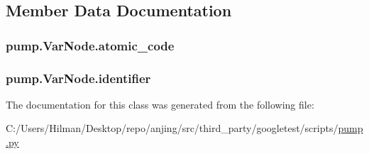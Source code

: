 \subsection{Member Data Documentation}
\hypertarget{classpump_1_1_var_node_ad6bef6a8577b994fbe9ccddf3c82d2fc}{}
\subsubsection[{atomic\+\_\+code}]{\setlength{\rightskip}{0pt plus 5cm}pump.\+Var\+Node.\+atomic\+\_\+code}\label{classpump_1_1_var_node_ad6bef6a8577b994fbe9ccddf3c82d2fc}
\hypertarget{classpump_1_1_var_node_aa2b634e2443646c3754f2d193efa4dc7}{}
\subsubsection[{identifier}]{\setlength{\rightskip}{0pt plus 5cm}pump.\+Var\+Node.\+identifier}\label{classpump_1_1_var_node_aa2b634e2443646c3754f2d193efa4dc7}


The documentation for this class was generated from the following file\+:\begin{DoxyCompactItemize}
\item 
C\+:/\+Users/\+Hilman/\+Desktop/repo/anjing/src/third\+\_\+party/googletest/scripts/\hyperlink{pump_8py}{pump.\+py}\end{DoxyCompactItemize}
